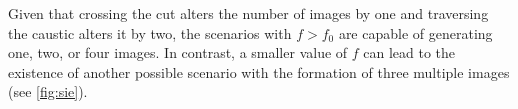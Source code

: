 Given that crossing the cut alters the number of images by one and traversing the caustic alters it by two, the scenarios with $f > f_0$ are capable of generating one, two, or four images. In contrast, a smaller value of $f$ can lead to the existence of another possible scenario with the formation of three multiple images (see \cref{fig:sie}).

\begin{figure}
  \begin{minipage}{0.5\linewidth}
    \centering
  \end{minipage}%
  \begin{minipage}{0.5\linewidth}
    \centering

\end{minipage}
\end{figure}

